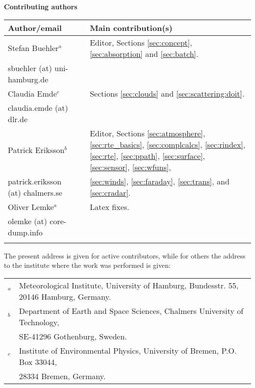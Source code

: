 \documentclass[11pt,twoside,a4paper,fleqn]{book}
\begin{document}
%
\newpage
\thispagestyle{plain}
%
\begin{center}
  {\Large \bf Contributing authors}
\end{center}
\vspace*{5mm}
\begin{tabular}{lp{10mm}l}
  \hline
  {\bf Author/email} & & {\bf Main contribution(s)} \\
  \hline
  Stefan Buehler$^a$ & & Editor, Sections \ref{sec:concept},
  \ref{sec:absorption} and \ref{sec:batch}.\\
  sbuehler (at) uni-hamburg.de & &        \\
 \hline
  Claudia Emde$^c$ & & Sections \ref{sec:clouds} and \ref{sec:scattering:doit}.\\
  claudia.emde (at) dlr.de & & \\
  \hline
  Patrick Eriksson$^b$ &  & Editor, 
  Sections \ref{sec:atmosphere}, \ref{sec:rte_basics}, \ref{sec:complcalcs}, 
  \ref{sec:rindex}, \ref{sec:rte}, \ref{sec:ppath}, \ref{sec:surface}, 
  \ref{sec:sensor}, \ref{sec:wfuns}, \\  
  patrick.eriksson (at) chalmers.se & & \ref{sec:winds}, \ref{sec:faraday}, 
  \ref{sec:trans}, 
  and \ref{sec:cradar}. \\
  \hline
  Oliver Lemke$^a$ & & Latex fixes.\\
  olemke (at) core-dump.info & & \\
  \hline
 &&\\
\end{tabular}


\vspace{1ex}\noindent
The present address is given for active contributors, while for others
the address to the institute where the work was performed is given:\\

\begin{tabular}[c]{ll}
$^a$&Meteorological Institute, University of Hamburg, Bundesstr. 55,
20146 Hamburg, Germany.\\
$^b$&Department of Earth and Space Sciences, Chalmers University of Technology,
\\&SE-41296 Gothenburg, Sweden. \\
$^c$&Institute of Environmental Physics, University of Bremen, P.O. Box 33044, 
\\&28334 Bremen, Germany.\\
\end{tabular}
\end{document}
